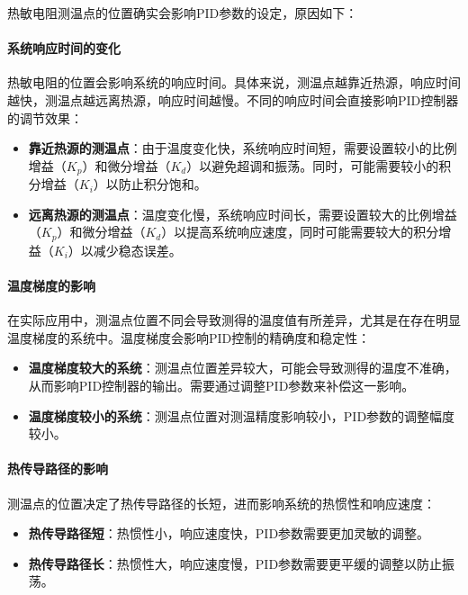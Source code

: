 \documentclass[dvipsnames, svgnames,a4paper,11pt]{article}
\begin{document}
热敏电阻测温点的位置确实会影响PID参数的设定，原因如下：

\paragraph*{系统响应时间的变化}

热敏电阻的位置会影响系统的响应时间。具体来说，测温点越靠近热源，响应时间越快，测温点越远离热源，响应时间越慢。不同的响应时间会直接影响PID控制器的调节效果：

\begin{itemize}
    \item \textbf{靠近热源的测温点}：由于温度变化快，系统响应时间短，需要设置较小的比例增益（$K_p$）和微分增益（$K_d$）以避免超调和振荡。同时，可能需要较小的积分增益（$K_i$）以防止积分饱和。
    \item \textbf{远离热源的测温点}：温度变化慢，系统响应时间长，需要设置较大的比例增益（$K_p$）和微分增益（$K_d$）以提高系统响应速度，同时可能需要较大的积分增益（$K_i$）以减少稳态误差。
\end{itemize}

\paragraph*{温度梯度的影响}

在实际应用中，测温点位置不同会导致测得的温度值有所差异，尤其是在存在明显温度梯度的系统中。温度梯度会影响PID控制的精确度和稳定性：

\begin{itemize}
    \item \textbf{温度梯度较大的系统}：测温点位置差异较大，可能会导致测得的温度不准确，从而影响PID控制器的输出。需要通过调整PID参数来补偿这一影响。
    \item \textbf{温度梯度较小的系统}：测温点位置对测温精度影响较小，PID参数的调整幅度较小。
\end{itemize}

\paragraph*{热传导路径的影响}

测温点的位置决定了热传导路径的长短，进而影响系统的热惯性和响应速度：

\begin{itemize}
    \item \textbf{热传导路径短}：热惯性小，响应速度快，PID参数需要更加灵敏的调整。
    \item \textbf{热传导路径长}：热惯性大，响应速度慢，PID参数需要更平缓的调整以防止振荡。
\end{itemize}
\end{document}
